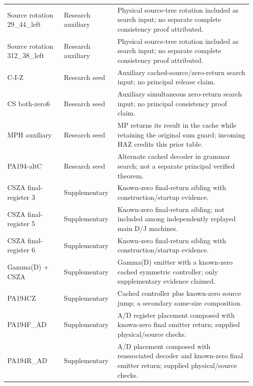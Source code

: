 \begin{longtable}{@{}p{.25\linewidth}p{.17\linewidth}p{.53\linewidth}@{}}
Source rotation 29\_44\_left & Research auxiliary & Physical source-tree rotation included as search input; no separate complete consistency proof attributed. \\
Source rotation 312\_38\_left & Research auxiliary & Physical source-tree rotation included as search input; no separate complete consistency proof attributed. \\
C-I-Z & Research seed & Auxiliary cached-source/zero-return search input; no principal release claim. \\
CS both-zero6 & Research seed & Auxiliary simultaneous zero-return search input; no principal consistency proof claim. \\
MPH auxiliary & Research seed & MP returns its result in the cache while retaining the original sum guard; incoming HAZ credits this prior table. \\
PA194-altC & Research seed & Alternate cached decoder in grammar search; not a separate principal verified theorem. \\
CSZA final-register 3 & Supplementary & Known-zero final-return sibling with construction/startup evidence. \\
CSZA final-register 5 & Supplementary & Known-zero final-return sibling; not included among independently replayed main D/J machines. \\
CSZA final-register 6 & Supplementary & Known-zero final-return sibling with construction/startup evidence. \\
Gamma(D) + CSZA & Supplementary & Gamma(D) emitter with a known-zero cached symmetric controller; only supplementary evidence claimed. \\
PA194CZ & Supplementary & Cached controller plus known-zero source jump; a secondary same-size composition. \\
PA194F\_AD & Supplementary & A/D register placement composed with known-zero final emitter return; supplied physical/source checks. \\
PA194R\_AD & Supplementary & A/D placement composed with reassociated decoder and known-zero final emitter return; supplied physical/source checks. \\
\end{longtable}\endgroup
